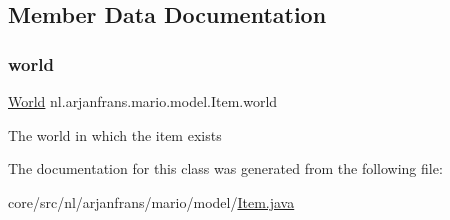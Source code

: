 \subsection{Member Data Documentation}
\mbox{\label{classnl_1_1arjanfrans_1_1mario_1_1model_1_1Item_ae5d6d1a768987daac29679cf194ee95d}} 
\subsubsection{\texorpdfstring{world}{world}}
{\footnotesize\ttfamily \hyperlink{classnl_1_1arjanfrans_1_1mario_1_1model_1_1World}{World} nl.\+arjanfrans.\+mario.\+model.\+Item.\+world\hspace{0.3cm}{\ttfamily [protected]}}

The world in which the item exists 

The documentation for this class was generated from the following file\+:\begin{DoxyCompactItemize}
\item 
core/src/nl/arjanfrans/mario/model/\hyperlink{Item_8java}{Item.\+java}\end{DoxyCompactItemize}
